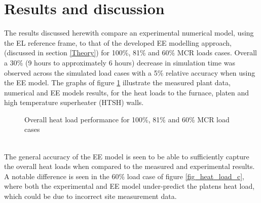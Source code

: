 \documentclass{webofc}
\begin{document}
\section{Results and discussion} \label{Results}
The results discussed herewith compare an experimental numerical model, using the EL reference frame, to that of the developed EE modelling approach, (discussed in section \ref{Theory}) for 100\%, 81\% and 60\% MCR loads cases. Overall a 30\% (9 hours to approximately 6 hours) decrease in simulation time was observed across the simulated load cases with a 5\% relative accuracy when using the EE model. The graphs of figure \ref{fig_heat_load} illustrate the measured plant data, numerical and EE models results,  for the heat loads to the furnace, platen and high temperature superheater (HTSH) walls. 
\begin{figure}[h!]
\centering
{}
\hspace{5mm}
\hspace{5mm}
\setlength{\belowcaptionskip}{0pt}
\caption{Overall heat load performance for 100\%, 81\% and 60\% MCR load cases}
\label{fig_heat_load}
\end{figure}\\
The general accuracy of the EE model is seen to be able to sufficiently capture the overall heat loads when compared to the measured and experimental results. A notable difference is seen in the 60\% load case of figure \ref{fig_heat_load_c}, where both the experimental and EE model under-predict the platens heat load, which could be due to incorrect site measurement data.
\end{document}
